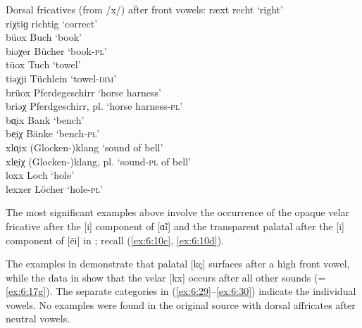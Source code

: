 \ea 
 \label{ex:6:28}Dorsal fricatives (from /x/) after front vowels:
\ea\label{ex:6:28a} ræxt   \tab [ræxt]   \tab recht      \tab ‘right’    \\
    riχtiɡ \tab [riçtig] \tab richtig    \tab ‘correct’  \\
\ex\label{ex:6:28b} büox   \tab [byox]   \tab Buch       \tab ‘book’     \\
    biǝχer \tab [biæçer] \tab Bücher     \tab ‘book-\textsc{pl}’    \\
\ex\label{ex:6:28c} tüox   \tab [tyox]   \tab Tuch       \tab ‘towel’   \\
    tiǝχji \tab [tiæçji] \tab Tüchlein   \tab ‘towel-\textsc{dim}’ \\
\ex\label{ex:6:28d} brüox  \tab [bryox]  \tab Pferdegeschirr        \tab ‘horse harness’    \\
    briǝχ  \tab [briæç]  \tab Pferdgeschirr, pl.    \tab ‘horse harness-\textsc{pl}’  \\
\ex\label{ex:6:28e} bɑ͔ix  \tab  [b\~ɑix]  \tab  Bank                 \tab  ‘bench’          \\
    be͔iχ  \tab  [blẽiç]  \tab  Bänke                \tab  ‘bench-\textsc{pl}’      \\
    xlɑ͔ix \tab  [xl\~ɑix] \tab  (Glocken-)klang      \tab  ‘sound of bell’  \\
    xle͔iχ \tab  [xlẽiç] \tab  (Glocken-)klang, pl. \tab  ‘sound-\textsc{pl} of bell’ \\
\ex\label{ex:6:28f} loxx   \tab [loxx]   \tab Loch                  \tab ‘hole’             \\
    lexxer \tab [lexxer] \tab Löcher                \tab ‘hole-\textsc{pl}’            \\
    \z
\z 

The most significant examples above involve the occurrence of the opaque velar fricative after the [i] component of [\~ɑi] and the transparent palatal after the [i] component of [ẽi] in ; recall (\ref{ex:6:10c}, \ref{ex:6:10d}).

The examples in  demonstrate that palatal [kç] surfaces after a high front vowel, while the data in  show that the velar [kx] occurs after all other sounds (=\ref{ex:6:17g}). The separate categories in (\ref{ex:6:29}--\ref{ex:6:30}) indicate the individual vowels. No examples were found in the original source with dorsal affricates after neutral vowels.


